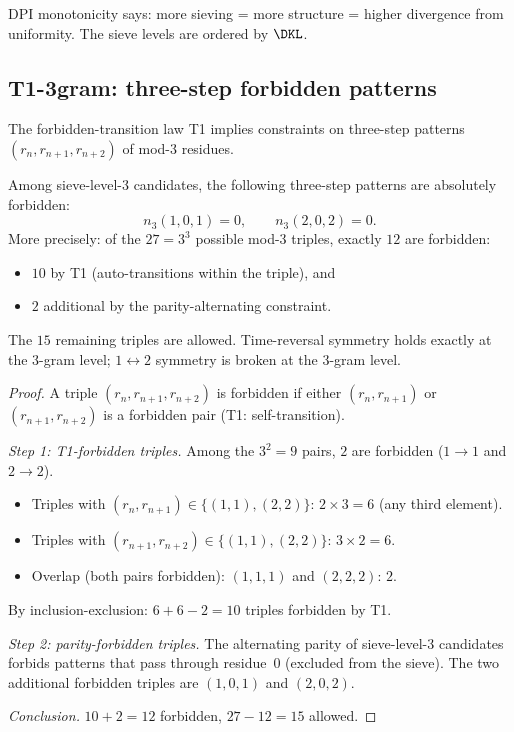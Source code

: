 \documentclass[12pt,a4paper]{article}
\begin{document}
DPI monotonicity says: more sieving = more structure = higher divergence
from uniformity. The sieve levels are ordered by $\DKL$.

\subsection{T1-3gram: three-step forbidden patterns}
\label{sec:T1_3gram}

The forbidden-transition law T1 implies constraints on three-step
patterns $(r_n, r_{n+1}, r_{n+2})$ of mod-3 residues.

\mTHM
\begin{theorem}
\label{thm:T1_3gram}
Among sieve-level-3 candidates, the following three-step patterns are
absolutely forbidden:
\begin{equation}
  n_3(1,0,1) = 0, \qquad n_3(2,0,2) = 0.
  \label{eq:T1_3gram}
\end{equation}
More precisely: of the $27 = 3^3$ possible mod-3 triples, exactly
$12$ are forbidden:
\begin{itemize}
\item $10$ by T1 (auto-transitions within the triple), and
\item $2$ additional by the parity-alternating constraint.
\end{itemize}
The $15$ remaining triples are allowed. Time-reversal symmetry holds
exactly at the 3-gram level; $1 \leftrightarrow 2$ symmetry is broken
at the 3-gram level.
\end{theorem}

\begin{proof}
A triple $(r_n, r_{n+1}, r_{n+2})$ is forbidden if either
$(r_n, r_{n+1})$ or $(r_{n+1}, r_{n+2})$ is a forbidden pair
(T1: self-transition).

\emph{Step 1: T1-forbidden triples.}
Among the $3^2 = 9$ pairs, $2$ are forbidden ($1\to1$ and $2\to2$).
\begin{itemize}[nosep]
\item Triples with $(r_n, r_{n+1}) \in \{(1,1),(2,2)\}$:
  $2 \times 3 = 6$ (any third element).
\item Triples with $(r_{n+1}, r_{n+2}) \in \{(1,1),(2,2)\}$:
  $3 \times 2 = 6$.
\item Overlap (both pairs forbidden): $(1,1,1)$ and $(2,2,2)$: $2$.
\end{itemize}
By inclusion-exclusion: $6 + 6 - 2 = 10$ triples forbidden by T1.

\emph{Step 2: parity-forbidden triples.}
The alternating parity of sieve-level-3 candidates forbids patterns
that pass through residue~0 (excluded from the sieve). The two
additional forbidden triples are $(1,0,1)$ and $(2,0,2)$.

\emph{Conclusion.}
$10 + 2 = 12$ forbidden, $27 - 12 = 15$ allowed.
\end{proof}
\end{document}
